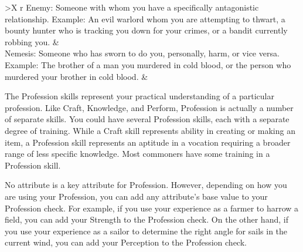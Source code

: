 \begin{dtable}
\begin{dtabularx}{\columnwidth}{>{\lcol}X r}
                Enemy: Someone with whom you have a specifically antagonistic relationship.
                Example: An evil warlord whom you are attempting to thwart, a bounty hunter who is tracking you down for your crimes, or a bandit currently robbing you.                                                          &   \\
                Nemesis: Someone who has sworn to do you, personally, harm, or vice versa. Example: The brother of a man you murdered in cold blood, or the person who murdered your brother in cold blood.                                                             &   \\
            \end{dtabularx}
        \end{dtable}

\newpage
{}
    The Profession skills represent your practical understanding of a particular profession.
        Like Craft, Knowledge, and Perform, Profession is actually a number of separate skills.
        You could have several Profession skills, each with a separate degree of training.
        While a Craft skill represents ability in creating or making an item, a Profession skill represents an aptitude in a vocation requiring a broader range of less specific knowledge.
        Most commoners have some training in a Profession skill.

        No attribute is a key attribute for Profession.
        However, depending on how you are using your Profession, you can add any attribute's base value to your Profession check.
        For example, if you use your experience as a farmer to harrow a field, you can add your Strength to the Profession check.
        On the other hand, if you use your experience as a sailor to determine the right angle for sails in the current wind, you can add your Perception to the Profession check.

